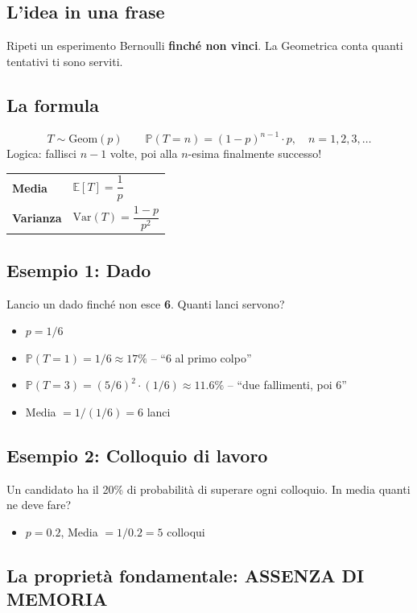 \documentclass[a4paper,11pt]{article}
\newcommand{\PP}{\mathbb{P}}
\newcommand{\E}{\mathbb{E}}
\begin{document}
\subsection*{L'idea in una frase}
Ripeti un esperimento Bernoulli \textbf{finché non vinci}. La Geometrica conta quanti tentativi ti sono serviti.

\subsection*{La formula}
\[
T \sim \text{Geom}(p) \qquad \PP(T = n) = (1-p)^{n-1} \cdot p, \quad n = 1, 2, 3, \dots
\]
Logica: fallisci $n-1$ volte, poi alla $n$-esima finalmente successo!

\begin{center}
\begin{tabular}{ll}
\toprule
\textbf{Media} & $\E[T] = \dfrac{1}{p}$ \\[6pt]
\textbf{Varianza} & $\text{Var}(T) = \dfrac{1-p}{p^2}$ \\
\bottomrule
\end{tabular}
\end{center}

\subsection*{Esempio 1: Dado}
Lancio un dado finché non esce \textbf{6}. Quanti lanci servono?
\begin{itemize}[nosep]
    \item $p = 1/6$
    \item $\PP(T=1) = 1/6 \approx 17\%$ -- ``6 al primo colpo''
    \item $\PP(T=3) = (5/6)^2 \cdot (1/6) \approx 11.6\%$ -- ``due fallimenti, poi 6''
    \item Media $= 1/(1/6) = 6$ lanci
\end{itemize}

\subsection*{Esempio 2: Colloquio di lavoro}
Un candidato ha il 20\% di probabilità di superare ogni colloquio. In media quanti ne deve fare?
\begin{itemize}[nosep]
    \item $p = 0.2$, Media $= 1/0.2 = 5$ colloqui
\end{itemize}

\subsection*{La proprietà fondamentale: ASSENZA DI MEMORIA}
\end{document}
